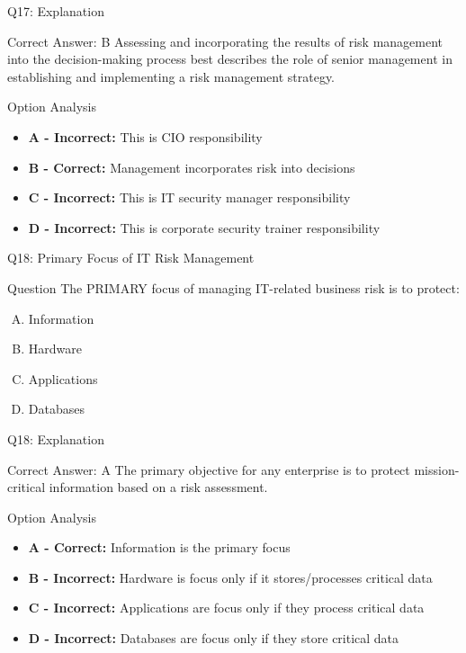 \documentclass{beamer}
\begin{document}
	\begin{frame}{Q17: Explanation}
		\begin{block}{Correct Answer: B}
			Assessing and incorporating the results of risk management into the decision-making process best describes the role of senior management in establishing and implementing a risk management strategy.
		\end{block}
		\begin{block}{Option Analysis}
			\begin{itemize}
				\item \textbf{A - Incorrect:} This is CIO responsibility
				\item \textbf{B - Correct:} Management incorporates risk into decisions
				\item \textbf{C - Incorrect:} This is IT security manager responsibility
				\item \textbf{D - Incorrect:} This is corporate security trainer responsibility
			\end{itemize}
		\end{block}
	\end{frame}
	
	\begin{frame}{Q18: Primary Focus of IT Risk Management}
		\begin{block}{Question}
			The PRIMARY focus of managing IT-related business risk is to protect:
		\end{block}
		\begin{enumerate}[(A)]
			\item Information
			\item Hardware
			\item Applications
			\item Databases
		\end{enumerate}
	\end{frame}
	
	\begin{frame}{Q18: Explanation}
		\begin{block}{Correct Answer: A}
			The primary objective for any enterprise is to protect mission-critical information based on a risk assessment.
		\end{block}
		\begin{block}{Option Analysis}
			\begin{itemize}
				\item \textbf{A - Correct:} Information is the primary focus
				\item \textbf{B - Incorrect:} Hardware is focus only if it stores/processes critical data
				\item \textbf{C - Incorrect:} Applications are focus only if they process critical data
				\item \textbf{D - Incorrect:} Databases are focus only if they store critical data
			\end{itemize}
		\end{block}
	\end{frame}
	
\end{document}

